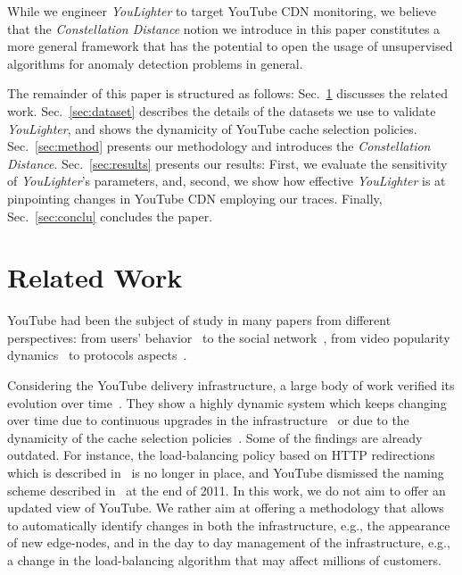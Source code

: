 \documentclass{acm_proc_article-sp}
\newcommand{\tool}{\textit{YouLighter}\xspace}
\newcommand{\distance}{\textit{Constellation Distance}\xspace}
\newcommand{\nodes}{{edge-nodes}\xspace}
\begin{document}
While we engineer \tool to target YouTube CDN monitoring, we believe that the \distance notion we introduce in this paper constitutes a more general framework that has the potential to open the usage of unsupervised algorithms for anomaly detection problems in general.

The remainder of this paper is structured as follows: Sec.~\ref{sec:related} discusses the related work. Sec.~\ref{sec:dataset} describes the details of the datasets we use to validate \tool, and shows the dynamicity of YouTube cache selection policies. Sec.~\ref{sec:method} presents our methodology and introduces the \distance. Sec.~\ref{sec:results} presents our results: First, we evaluate the sensitivity of \tool's parameters, and, second, we show how effective \tool is at pinpointing changes in YouTube CDN employing our traces. Finally, Sec.~\ref{sec:conclu} concludes the paper.


\section{Related Work}
\label{sec:related}
YouTube had been the subject of study in many papers from different perspectives: from users' behavior~\cite{Gill_2007}
to the social network~\cite{Xu_2008},
from video popularity dynamics~\cite{Figueiredo_2011}
to protocols aspects~\cite{Alcock_2011,Krishnappa_2013}.

Considering the YouTube delivery infrastructure, a large body of work verified its evolution over time~\cite{ CalderIMC13, Adhikari2012_infocom, Torres_2011, Cas2014, Adhikari_2010,  Hossfeld_2013}.
They show a highly dynamic system which keeps changing over time due to continuous upgrades in the infrastructure~\cite{CalderIMC13,Adhikari2012_infocom} or due to the dynamicity of the cache selection policies~\cite{Torres_2011,Cas2014,Adhikari_2010,Hossfeld_2013}.
Some of the findings are already outdated. For instance, the load-balancing policy based on HTTP redirections which is described in~\cite{Torres_2011,Hossfeld_2013} is no longer in place, and YouTube dismissed the naming scheme described in~\cite{Adhikari2012_infocom} at the end of 2011.
In this work, we do not aim to offer an updated view of YouTube. We rather aim at offering a methodology that allows to automatically identify changes in both the infrastructure, e.g., the appearance of new \nodes, and in the day to day management of the infrastructure, e.g., a change in the load-balancing algorithm that may affect millions of customers.
\end{document}
